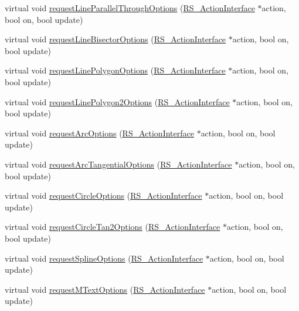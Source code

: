 \begin{DoxyCompactItemize}
\item 
virtual void \hyperlink{classQG__DialogFactory_a695044f186e3e3c16edf19a7d65b9dd1}{request\-Line\-Parallel\-Through\-Options} (\hyperlink{classRS__ActionInterface}{R\-S\-\_\-\-Action\-Interface} $\ast$action, bool on, bool update)
\item 
virtual void \hyperlink{classQG__DialogFactory_a4673b0777cf18f7e1874fcc65b82ac26}{request\-Line\-Bisector\-Options} (\hyperlink{classRS__ActionInterface}{R\-S\-\_\-\-Action\-Interface} $\ast$action, bool on, bool update)
\item 
virtual void \hyperlink{classQG__DialogFactory_a6673fc58e31d5f5f9f1ae333c75d4540}{request\-Line\-Polygon\-Options} (\hyperlink{classRS__ActionInterface}{R\-S\-\_\-\-Action\-Interface} $\ast$action, bool on, bool update)
\item 
virtual void \hyperlink{classQG__DialogFactory_a7107fcfcd53c78f8f2d87a3be97842aa}{request\-Line\-Polygon2\-Options} (\hyperlink{classRS__ActionInterface}{R\-S\-\_\-\-Action\-Interface} $\ast$action, bool on, bool update)
\item 
virtual void \hyperlink{classQG__DialogFactory_ae7011bf05c42acaf91fead0e37e29bf3}{request\-Arc\-Options} (\hyperlink{classRS__ActionInterface}{R\-S\-\_\-\-Action\-Interface} $\ast$action, bool on, bool update)
\item 
virtual void \hyperlink{classQG__DialogFactory_a5fdeb7adb818efb524fe5b1b4e1851c7}{request\-Arc\-Tangential\-Options} (\hyperlink{classRS__ActionInterface}{R\-S\-\_\-\-Action\-Interface} $\ast$action, bool on, bool update)
\item 
virtual void \hyperlink{classQG__DialogFactory_a6ac9c0bdefb56a90285281ac4d64b92f}{request\-Circle\-Options} (\hyperlink{classRS__ActionInterface}{R\-S\-\_\-\-Action\-Interface} $\ast$action, bool on, bool update)
\item 
virtual void \hyperlink{classQG__DialogFactory_a84ca281d5618758e10839874221a11a3}{request\-Circle\-Tan2\-Options} (\hyperlink{classRS__ActionInterface}{R\-S\-\_\-\-Action\-Interface} $\ast$action, bool on, bool update)
\item 
virtual void \hyperlink{classQG__DialogFactory_adbeae0efba2bde77f8f0047023125867}{request\-Spline\-Options} (\hyperlink{classRS__ActionInterface}{R\-S\-\_\-\-Action\-Interface} $\ast$action, bool on, bool update)
\item 
virtual void \hyperlink{classQG__DialogFactory_a3f912db3392a223e2012d68b359d7287}{request\-M\-Text\-Options} (\hyperlink{classRS__ActionInterface}{R\-S\-\_\-\-Action\-Interface} $\ast$action, bool on, bool update)

\end{DoxyCompactItemize}
